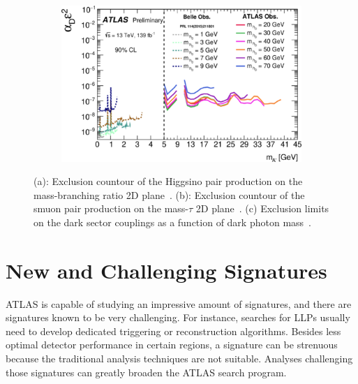 \documentclass{moriond}
\begin{document}
\begin{figure}[htp]
\begin{subfigure}[b]{0.25\textwidth}
         \caption{}
         \label{fig:micro}
     \end{subfigure}
     \begin{subfigure}[b]{0.25\textwidth}
         \centering
         \includegraphics[width=\textwidth]{dark}
         \caption{}
         \label{fig:dark}
     \end{subfigure}
        \caption{(a): Exclusion countour of the Higgsino pair production on the mass-branching ratio 2D plane~\cite{bbyy}. (b): Exclusion countour of the smuon pair production on the mass-$\tau$ 2D plane~\cite{micro}. (c) Exclusion limits on the dark sector couplings as a function of dark photon mass~\cite{dark}.}
        \label{fig:limits2}
\end{figure}

\section{New and Challenging Signatures}

ATLAS is capable of studying an impressive amount of signatures, and there are
signatures known to be very challenging. For instance, searches for LLPs
usually need to develop dedicated triggering or reconstruction algorithms.
Besides less optimal detector performance in certain regions, a signature can
be strenuous because the traditional analysis techniques are not suitable.
Analyses challenging those signatures can greatly broaden the ATLAS search
program.\\
\end{document}
